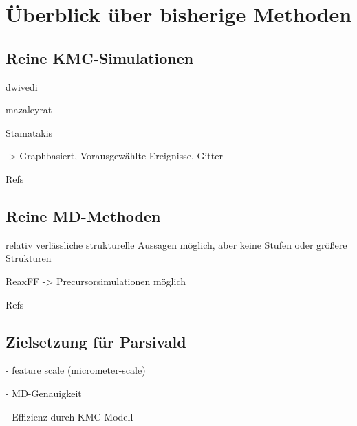\section{Überblick über bisherige Methoden}

\subsection{Reine KMC-Simulationen}

dwivedi

mazaleyrat

Stamatakis

-> Graphbasiert, Vorausgewählte Ereignisse, Gitter

Refs


\subsection{Reine MD-Methoden}

relativ verlässliche strukturelle Aussagen möglich, aber keine Stufen oder größere Strukturen

ReaxFF -> Precursorsimulationen möglich

Refs


\subsection{Zielsetzung für Parsivald}

- feature scale (micrometer-scale)

- MD-Genauigkeit

- Effizienz durch KMC-Modell
